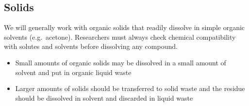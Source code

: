 \hypertarget{solids}{%
\subsection{Solids}\label{solids}}

We will generally work with organic solids that readily dissolve in
simple organic solvents (e.g.~acetone). Researchers must always check
chemical compatibility with solutes and solvents before dissolving any
compound.

\begin{itemize}
\item
  Small amounts of organic solids may be dissolved in a small amount of
  solvent and put in organic liquid waste
\item
  Larger amounts of solids should be transferred to solid waste and the
  residue should be dissolved in solvent and discarded in liquid waste
\end{itemize}
